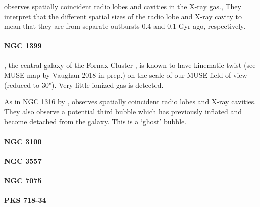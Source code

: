 \citet{Lanz2010} observes spatially coincident radio lobes and cavities in the X-ray gas., They interpret that the different spatial sizes of the radio lobe and X-ray cavity to mean that they are from separate outbursts 0.4 and 0.1 Gyr ago, respectively.

\paragraph{NGC 1399}, the central galaxy of the Fornax Cluster \citep{Jordan2007}, is known to have kinematic twist (see MUSE map by Vaughan 2018 in prep.) on the scale of our MUSE field of view (reduced to 30"). Very little ionized gas is detected. 

As in NGC 1316 by \citet{Lanz2010}, \citet{Su2017} observes spatially coincident radio lobes and X-ray cavities. They also observe a potential third bubble which has previously inflated and become detached from the galaxy. This is a `ghost' bubble.

\paragraph{NGC 3100}

\paragraph{NGC 3557}


\paragraph{NGC 7075}

\paragraph{PKS 718-34}


